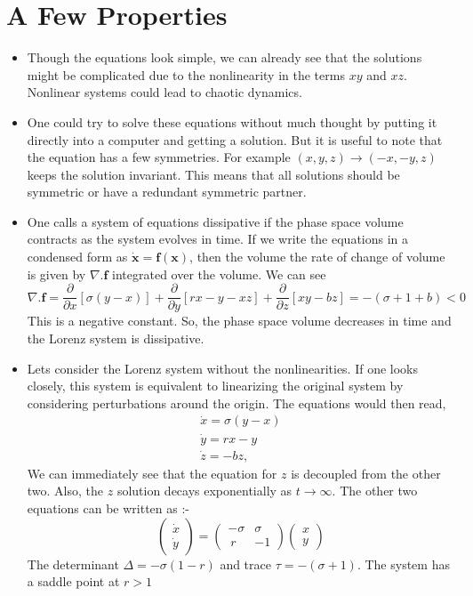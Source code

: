 \section{A Few Properties}
\begin{itemize}
	\item Though the equations look simple, we can already see that the solutions might be complicated due to the nonlinearity in the terms $xy$ and $xz$. Nonlinear systems could lead to chaotic dynamics.
	\item One could try to solve these equations without much thought by putting it directly into a computer and getting a solution. But it is useful to note that the equation has a few symmetries. For example $(x,y,z) \rightarrow (-x,-y,z)$ keeps the solution invariant. This means that all solutions should be symmetric or have a redundant symmetric partner.
	\item One calls a system of equations dissipative if the phase space volume contracts as the system evolves in time. If we write the equations in a condensed form as $\dot{\boldsymbol{x}} = \boldsymbol{f}(\boldsymbol{x})$, then the volume the rate of change of volume is given by $\nabla.\boldsymbol{f}$ integrated over the volume. We can see
	$$\nabla.\boldsymbol{f} = \frac{\partial}{\partial x}[\sigma(y-x)] + \frac{\partial}{\partial y}[rx-y-xz] + \frac{\partial}{\partial z}[xy-bz] = -(\sigma +1 +b) < 0$$
	This is a negative constant. So, the phase space volume decreases in time and the Lorenz system is dissipative.
	\item Lets consider the Lorenz system without the nonlinearities. If one looks closely, this system is equivalent to linearizing the original system by considering perturbations around the origin. The equations would then read,
	\begin{eqnarray}
		\dot{x} = \sigma(y-x) \\
		\dot{y} = rx - y \\
		\dot{z} = - bz,
	\end{eqnarray}
	We can immediately see that the equation for $z$ is decoupled from the other two. Also, the $z$ solution decays exponentially as $t\rightarrow \infty$. The other two equations can be written as :-
	$$\left(\begin{array}{cc} \dot{x} \\\dot{y} \end{array}\right) = \left(\begin{array}{cc} -\sigma & \sigma \\\ r & -1 \end{array}\right) \left(\begin{array}{cc} x \\y \end{array}\right)$$
	The determinant $\Delta=-\sigma(1-r)$ and trace $\tau = -(\sigma+1)$. The system has a saddle point at $r>1$
\end{itemize}	
